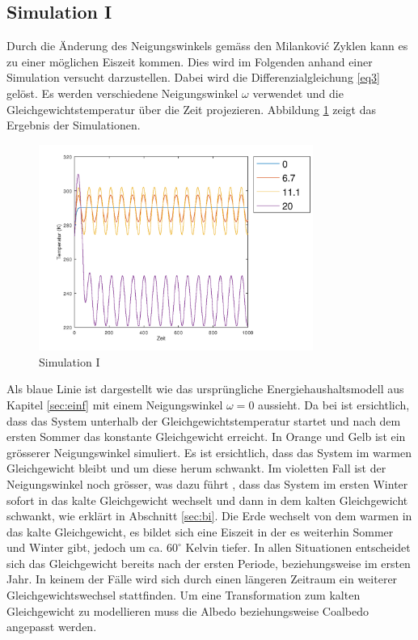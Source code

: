 \begin{refsection}
\subsection{Simulation I} \label{sec:sim1} 
Durch die Änderung des Neigungswinkels gemäss den Milankovi\'c Zyklen kann es zu einer möglichen Eiszeit kommen. Dies wird im Folgenden anhand einer Simulation versucht darzustellen. Dabei wird die Differenzialgleichung \eqref{eq3} gelöst. Es werden verschiedene Neigungswinkel $\omega$ verwendet und die Gleichgewichtstemperatur über die Zeit projezieren. Abbildung \ref{fig:abb9} zeigt das Ergebnis der Simulationen. 
%
\begin{figure}
	\centering
	\includegraphics[width= 0.8\textwidth]{neigung/Zeitachse_0.png}
	\caption[Simulation I]{Simulation I}
	\label{fig:abb9}
\end{figure}
%
Als blaue Linie ist dargestellt wie das ursprüngliche Energiehaushaltsmodell aus Kapitel \ref{sec:einf} mit einem Neigungswinkel $\omega=0$ aussieht. Da bei ist ersichtlich, dass das System unterhalb der Gleichgewichtstemperatur startet und nach dem ersten Sommer das konstante Gleichgewicht erreicht. In Orange und Gelb ist ein grösserer Neigungswinkel simuliert. Es ist ersichtlich, dass das System im warmen Gleichgewicht bleibt und um diese herum schwankt. Im violetten Fall ist der Neigungswinkel noch grösser, was dazu führt , dass das System im ersten Winter sofort in das kalte Gleichgewicht wechselt und dann in dem kalten Gleichgewicht schwankt, wie erklärt in Abschnitt \ref{sec:bi}. Die Erde wechselt von dem warmen in das kalte Gleichgewicht, es bildet sich eine Eiszeit in der es weiterhin Sommer und Winter gibt, jedoch um ca. $60 ^\circ$ Kelvin tiefer. 
In allen Situationen entscheidet sich das Gleichgewicht bereits nach der ersten Periode, beziehungsweise im ersten Jahr. In keinem der Fälle wird sich durch einen längeren Zeitraum ein weiterer Gleichgewichtswechsel stattfinden. Um eine Transformation zum kalten Gleichgewicht zu modellieren muss die Albedo beziehungsweise Coalbedo angepasst werden. 



\end{refsection}
